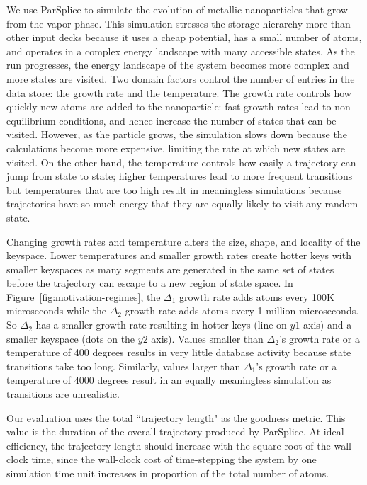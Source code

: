 We use ParSplice to simulate the evolution of metallic nanoparticles that grow
from the vapor phase.  This simulation stresses the storage hierarchy more than
other input decks because it uses a cheap potential, has a small number of
atoms, and operates in a complex energy landscape with many accessible states.
As the run progresses, the energy landscape of the system becomes more complex
and more states are visited.  Two domain factors control the number of entries
in the data store: the growth rate and the temperature. The growth rate
controls how quickly new atoms are added to the nanoparticle: fast growth rates
lead to non-equilibrium conditions, and hence increase the number of states
that can be visited.  However, as the particle grows, the simulation slows down
because the calculations become more expensive, limiting the rate at which new
states are visited.  On the other hand, the temperature controls how easily a
trajectory can jump from state to state; higher temperatures lead to more
frequent transitions but temperatures that are too high result in meaningless
simulations because trajectories have so much energy that they are equally
likely to visit any random state. 

Changing growth rates and temperature alters the size, shape, and locality of
the keyspace. Lower temperatures and smaller growth rates create
hotter keys with smaller keyspaces as many segments are generated in the same
set of states before the trajectory can escape to a new region of state space.
In Figure~\ref{fig:motivation-regimes}, the \(\Delta_1\) growth rate adds atoms
every 100K microseconds while the \(\Delta_2\) growth rate adds atoms every 1
million microseconds. So \(\Delta_2\) has a smaller growth rate resulting in
hotter keys (line on \(y1\) axis) and a smaller keyspace (dots on the \(y2\)
axis).  Values smaller than \(\Delta_2\)'s growth rate or a temperature of 400
degrees results in very little database activity because state transitions take
too long. Similarly, values larger than \(\Delta_1\)'s growth rate or a
temperature of 4000 degrees result in an equally meaningless simulation as
transitions are unrealistic.

Our evaluation uses the total ``trajectory length" as the goodness metric. This
value is the duration of the overall trajectory produced by ParSplice. At
ideal efficiency, the trajectory length should increase with the square root of
the wall-clock time, since the wall-clock cost of time-stepping the system by
one simulation time unit increases in proportion of the total number of atoms.

